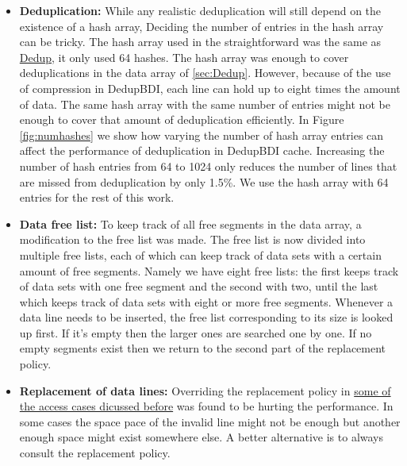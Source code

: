 \begin{itemize}
    \item \textbf{Deduplication:} While any realistic deduplication will still depend on the existence of a hash array, Deciding the number of entries in the hash array can be tricky. The hash array used in the straightforward was the same as \hyperref[sssec:DedupHash]{Dedup}, it only used 64 hashes. The hash array was enough to cover deduplications in the data array of \ref{sec:Dedup}. However, because of the use of compression in DedupBDI, each line can hold up to eight times the amount of data. The same hash array with the same number of entries might not be enough to cover that amount of deduplication efficiently. In Figure \ref{fig:numhashes} we show how varying the number of hash array entries can affect the performance of deduplication in DedupBDI cache. Increasing the number of hash entries from 64 to 1024 only reduces the number of lines that are missed from deduplication by only 1.5\%. We use the hash array with 64 entries for the rest of this work.
    \item \textbf{Data free list:} To keep track of all free segments in the data array, a modification to the free list was made. The free list is now divided into multiple free lists, each of which can keep track of data sets with a certain amount of free segments. Namely we have eight free lists: the first keeps track of data sets with one free segment and the second with two, until the last which keeps track of data sets with eight or more free segments. Whenever a data line needs to be inserted, the free list corresponding to its size is looked up first. If it's empty then the larger ones are searched one by one. If no empty segments exist then we return to the second part of the replacement policy.
    \item \textbf{Replacement of data lines:} Overriding the replacement policy in \hyperref[itm:override]{some of the access cases dicussed before} was found to be hurting the performance. In some cases the space pace of the invalid line might not be enough but another enough space might exist somewhere else. A better alternative is to always consult the replacement policy. 
\end{itemize}
